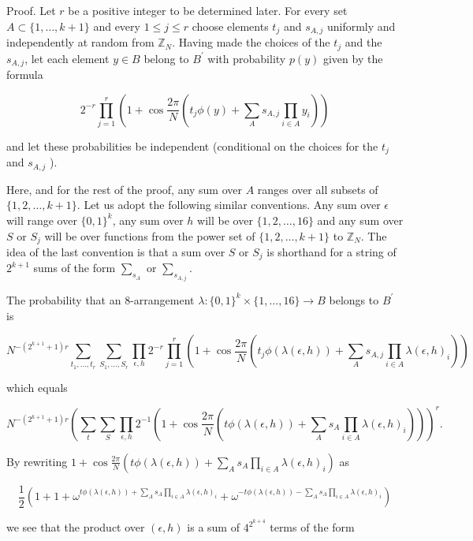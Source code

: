 \documentclass[10pt]{article}
\begin{document}
Proof. Let $r$ be a positive integer to be determined later. For every set $A \subset\{1, \ldots, k+1\}$ and every $1 \leqslant j \leqslant r$ choose elements $t_{j}$ and $s_{A, j}$ uniformly and independently at random from $\mathbb{Z}_{N}$. Having made the choices of the $t_{j}$ and the $s_{A, j}$, let each element $y \in B$ belong to $B^{\prime}$ with probability $p(y)$ given by the formula

$$
2^{-r} \prod_{j=1}^{r}\left(1+\cos \frac{2 \pi}{N}\left(t_{j} \phi(y)+\sum_{A} s_{A, j} \prod_{i \in A} y_{i}\right)\right)
$$

and let these probabilities be independent (conditional on the choices for the $t_{j}$ and $s_{A, j}$ ).

Here, and for the rest of the proof, any sum over $A$ ranges over all subsets of $\{1,2, \ldots, k+1\}$. Let us adopt the following similar conventions. Any sum over $\epsilon$ will range over $\{0,1\}^{k}$, any sum over $h$ will be over $\{1,2, \ldots, 16\}$ and any sum over $S$ or $S_{j}$ will be over functions from the power set of $\{1,2, \ldots, k+1\}$ to $\mathbb{Z}_{N}$. The idea of the last convention is that a sum over $S$ or $S_{j}$ is shorthand for a string of $2^{k+1}$ sums of the form $\sum_{s_{A}}$ or $\sum_{s_{A, j}}$.

The probability that an 8-arrangement $\lambda:\{0,1\}^{k} \times\{1, \ldots, 16\} \rightarrow B$ belongs to $B^{\prime}$ is

$$
N^{-\left(2^{k+1}+1\right) r} \sum_{t_{1}, \ldots, t_{r}} \sum_{S_{1}, \ldots, S_{r}} \prod_{\epsilon, h} 2^{-r} \prod_{j=1}^{r}\left(1+\cos \frac{2 \pi}{N}\left(t_{j} \phi(\lambda(\epsilon, h))+\sum_{A} s_{A, j} \prod_{i \in A}\lambda(\epsilon, h)_{i}\right)\right)
$$

which equals

$$
N^{-\left(2^{k+1}+1\right) r}\left(\sum_{t} \sum_{S} \prod_{\epsilon, h} 2^{-1}\left(1+\cos \frac{2 \pi}{N}\left(t \phi(\lambda(\epsilon, h))+\sum_{A} s_{A} \prod_{i \in A}\lambda(\epsilon, h)_{i}\right)\right)\right)^{r}.
$$

By rewriting $1+\cos \frac{2 \pi}{N}\left(t \phi(\lambda(\epsilon, h))+\sum_{A} s_{A} \prod_{i \in A}\lambda(\epsilon, h)_{i}\right)$ as

$$
\frac{1}{2}\left(1+1+\omega^{t \phi(\lambda(\epsilon, h))+\sum_{A} s_{A} \prod_{i \in A}\lambda(\epsilon, h)_{i}}+\omega^{-t \phi(\lambda(\epsilon, h))-\sum_{A} s_{A} \prod_{i \in A}\lambda(\epsilon, h)_{i}}\right)
$$

we see that the product over $(\epsilon, h)$ is a sum of $4^{2^{k+4}}$ terms of the form
\end{document}
